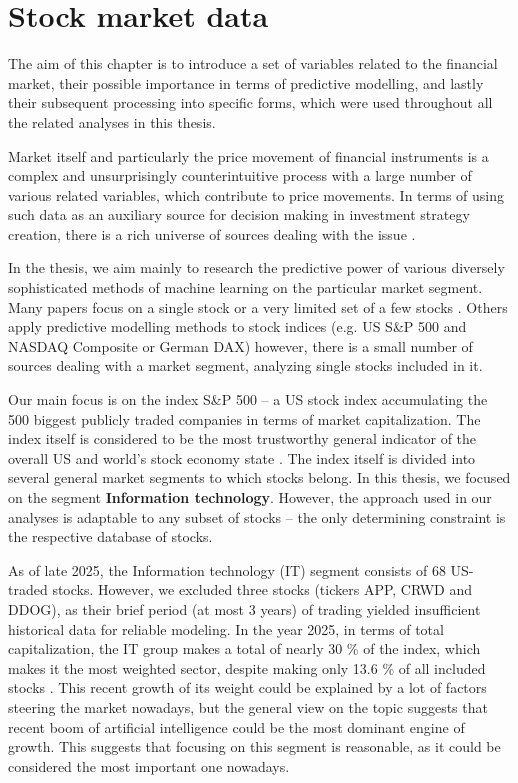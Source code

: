 \chapter{Stock market data}
\label{chap:2}
The aim of this chapter is to introduce a set of variables related to the financial market, 
their possible importance in terms of predictive modelling, and lastly their subsequent processing 
into specific forms, which were used throughout all the related analyses in this thesis.
\par
Market itself and particularly the price movement of financial instruments is a complex and unsurprisingly
counterintuitive process with a large number of various related variables, which contribute to price movements. 
In terms of using such data as an auxiliary source for decision making in investment strategy creation, there is a rich
universe of sources dealing with the issue \cite{clanok1, clanok2}.
\par
%
In the thesis, we aim mainly to research the predictive power of various diversely sophisticated
methods of machine learning on the particular market segment. Many papers focus on a
single stock or a very limited set of a few stocks \cite{clanok5, konferencia1}. Others apply predictive modelling methods
to stock indices (e.g. US S\&P 500 and NASDAQ Composite or German DAX) \cite{clanok4} however, there is 
a small number of sources dealing with a market segment, analyzing single stocks included in it.
\par
Our main focus is on the index S\&P 500 – a US stock index accumulating the 500 biggest publicly traded companies
in terms of market capitalization. The index itself is considered to be the most trustworthy general indicator of the overall
US and world’s stock economy state \cite{snp500}. The index itself is divided into several general market segments to which stocks belong. In this
thesis, we focused on the segment \textbf{Information technology}. However, the approach used in our analyses is adaptable to any subset of stocks –
the only determining constraint is the respective database of stocks.
\par
As of late 2025, the Information technology (IT) segment consists of $68$ US-traded stocks. However, we excluded three stocks (tickers APP, CRWD and DDOG), as their brief period (at most $3$ years) of trading yielded insufficient historical data for reliable modeling. In the year 2025, in terms of total capitalization, the IT group makes a total of
nearly 30 \% of the index, which makes it the most weighted sector, despite making only 13.6 \% of all included stocks \cite{cnbc}. This recent growth of its weight 
could be explained by a lot of factors steering the market nowadays, but the general view on the topic suggests that recent boom of artificial 
intelligence could be the most dominant engine of growth. This suggests that focusing on this segment is reasonable, as it could be considered the most important one nowadays.

